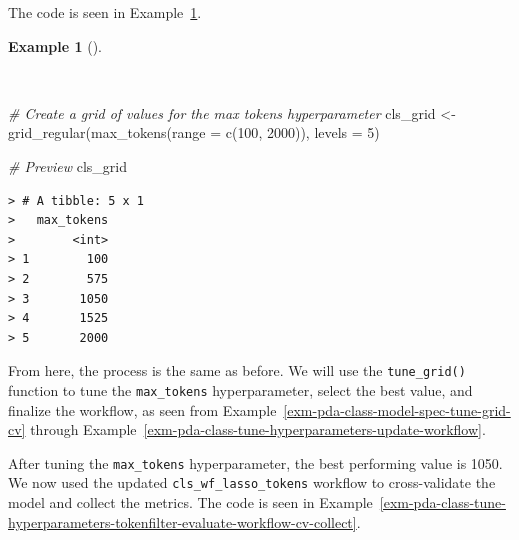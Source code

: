 \documentclass[
  letterpaper,
]{latex/krantz}
\newenvironment{Shaded}{\begin{snugshade}}{\end{snugshade}}
\newcommand{\AttributeTok}[1]{\textcolor[rgb]{0.00,0.00,0.00}{#1}}
\newcommand{\CommentTok}[1]{\textcolor[rgb]{0.00,0.00,0.00}{\textit{#1}}}
\newcommand{\DecValTok}[1]{\textcolor[rgb]{0.00,0.00,0.00}{#1}}
\newcommand{\FunctionTok}[1]{\textcolor[rgb]{0.00,0.00,0.00}{#1}}
\newcommand{\NormalTok}[1]{\textcolor[rgb]{0.00,0.00,0.00}{#1}}
\newcommand{\OtherTok}[1]{\textcolor[rgb]{0.00,0.00,0.00}{#1}}
\theoremstyle{definition}
\newtheorem{example}{Example}[chapter]
\theoremstyle{remark}
\begin{document}
The code is seen in
Example~\ref{exm-pda-class-tune-hyperparameters-tokenfilter-grid}.

\begin{example}[]\protect\hypertarget{exm-pda-class-tune-hyperparameters-tokenfilter-grid}{}\label{exm-pda-class-tune-hyperparameters-tokenfilter-grid}

~

\begin{Shaded}
\begin{Highlighting}[]
\CommentTok{\# Create a grid of values for the max tokens hyperparameter}
\NormalTok{cls\_grid }\OtherTok{\textless{}{-}}
  \FunctionTok{grid\_regular}\NormalTok{(}\FunctionTok{max\_tokens}\NormalTok{(}\AttributeTok{range =} \FunctionTok{c}\NormalTok{(}\DecValTok{100}\NormalTok{, }\DecValTok{2000}\NormalTok{)), }\AttributeTok{levels =} \DecValTok{5}\NormalTok{)}

\CommentTok{\# Preview}
\NormalTok{cls\_grid}
\end{Highlighting}
\end{Shaded}

\begin{verbatim}
> # A tibble: 5 x 1
>   max_tokens
>        <int>
> 1        100
> 2        575
> 3       1050
> 4       1525
> 5       2000
\end{verbatim}

\end{example}

From here, the process is the same as before. We will use the
\texttt{tune\_grid()} function to tune the \texttt{max\_tokens}
hyperparameter, select the best value, and finalize the workflow, as
seen from Example~\ref{exm-pda-class-model-spec-tune-grid-cv} through
Example~\ref{exm-pda-class-tune-hyperparameters-update-workflow}.

After tuning the \texttt{max\_tokens} hyperparameter, the best
performing value is 1050. We now used the updated
\texttt{cls\_wf\_lasso\_tokens} workflow to cross-validate the model and
collect the metrics. The code is seen in
Example~\ref{exm-pda-class-tune-hyperparameters-tokenfilter-evaluate-workflow-cv-collect}.
\end{document}
